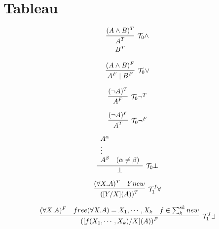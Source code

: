 \section{Tableau}

\begin{multicols}{2}
    \noindent
    \begin{minipage}{\linewidth}
        \[
            \infer[\mathcal{T}_0 \land]{
                \begin{array}{c}
                    A^T \\
                    B^T
                \end{array}
            }{(A \land B)^T}
        \]
    \end{minipage}

    \noindent
    \begin{minipage}{\linewidth}
        \[
            \infer[\mathcal{T}_0 \lor]{A^F \mid B^F}{(A \land B)^F}
        \]
    \end{minipage}
\end{multicols}

\begin{multicols}{2}
    \noindent
    \begin{minipage}{\linewidth}
        \[
            \infer[\mathcal{T}_0 \neg^T]{A^F}{(\neg A)^T}
        \]
    \end{minipage}

    \noindent
    \begin{minipage}{\linewidth}
        \[
            \infer[\mathcal{T}_0 \neg^F]{A^T}{(\neg A)^F}
        \]
    \end{minipage}
\end{multicols}

\noindent
\begin{minipage}{\linewidth}
    \[
        \infer[\mathcal{T}_0 \bot]{\bot}{
            \begin{array}{ll}
                A^\alpha & \\
                \vdots & \\
                A^\beta & (\alpha \neq \beta)
            \end{array}
        }
    \]
\end{minipage}

\begin{multicols}{2}
    \noindent
    \begin{minipage}{\linewidth}
        \[
            \infer[\mathcal{T}_1^f \forall]{([Y/X](A))^T}{(\forall X.A)^T \quad Y new}
        \]
    \end{minipage}

    \noindent
    \begin{minipage}{\linewidth}
        \[
            \infer[\mathcal{T}_1^f \exists]{([f(X_1,\cdots,X_k)/X](A))^F}{
                (\forall X.A)^F \quad
                free(\forall X.A) = {X_1,\cdots,X_k} \quad
                f \in \sum_{k}^{sk} new
            }
        \]
    \end{minipage}
\end{multicols}

